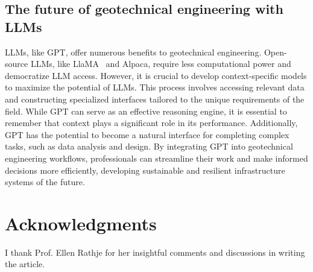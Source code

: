 \documentclass[12pt]{article}
\begin{document}
\subsection{The future of geotechnical engineering with LLMs}
LLMs, like GPT, offer numerous benefits to geotechnical engineering. Open-source LLMs, like LlaMA~\parencite{touvron2023llama} and Alpaca, require less computational power and democratize LLM access. However, it is crucial to develop context-specific models to maximize the potential of LLMs. This process involves accessing relevant data and constructing specialized interfaces tailored to the unique requirements of the field. While GPT can serve as an effective reasoning engine, it is essential to remember that context plays a significant role in its performance. Additionally, GPT has the potential to become a natural interface for completing complex tasks, such as data analysis and design. By integrating GPT into geotechnical engineering workflows, professionals can streamline their work and make informed decisions more efficiently, developing sustainable and resilient infrastructure systems of the future.
\section*{Acknowledgments}
I thank Prof. Ellen Rathje for her insightful comments and discussions in writing the article. 
\clearpage
\printbibliography
\end{document}
